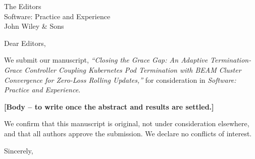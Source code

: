 \documentclass[11pt,a4paper]{letter}
\begin{document}
\begin{letter}{The Editors\\Software: Practice and Experience\\John Wiley \& Sons}
\opening{Dear Editors,}

We submit our manuscript, \emph{``Closing the Grace Gap: An Adaptive Termination-Grace Controller
Coupling Kubernetes Pod Termination with BEAM Cluster Convergence for Zero-Loss Rolling Updates,''}
for consideration in \emph{Software: Practice and Experience}.

\textbf{[Body -- to write once the abstract and results are settled.]}

We confirm that this manuscript is original, not under consideration elsewhere, and that all authors
approve the submission. We declare no conflicts of interest.

\closing{Sincerely,}
\end{letter}
\end{document}
